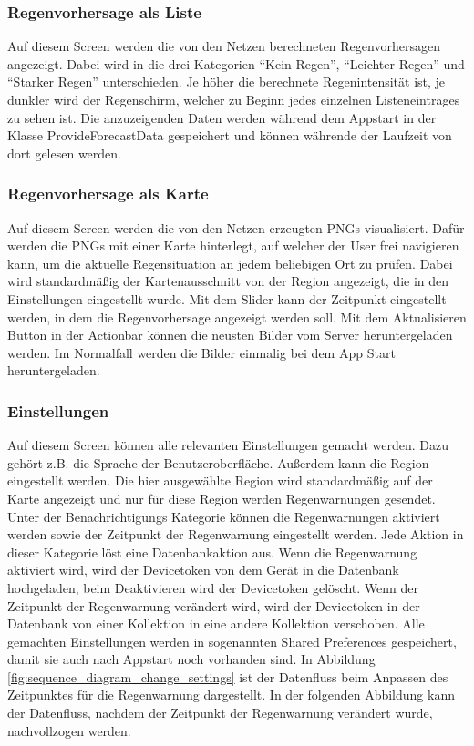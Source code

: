 \subsubsection*{Regenvorhersage als Liste}
Auf diesem Screen werden die von den Netzen berechneten Regenvorhersagen angezeigt. 
Dabei wird in die drei Kategorien “Kein Regen”, “Leichter Regen” und “Starker Regen” unterschieden. 
Je höher die berechnete Regenintensität ist, je dunkler wird der Regenschirm, welcher zu Beginn jedes einzelnen Listeneintrages zu sehen ist.   
Die anzuzeigenden Daten werden während dem Appstart in der Klasse ProvideForecastData gespeichert und können währende der Laufzeit
von dort gelesen werden.

\subsubsection*{Regenvorhersage als Karte}
Auf diesem Screen werden die von den Netzen erzeugten PNGs visualisiert. 
Dafür werden die PNGs mit einer Karte hinterlegt, auf welcher der User frei navigieren kann, 
um die aktuelle Regensituation an jedem beliebigen Ort zu prüfen. 
Dabei wird standardmäßig der Kartenausschnitt von der Region angezeigt, die in den Einstellungen eingestellt wurde. 
Mit dem Slider kann der Zeitpunkt eingestellt werden, in dem die Regenvorhersage angezeigt werden soll. 
Mit dem Aktualisieren Button in der Actionbar können die neusten Bilder vom Server heruntergeladen werden. 
Im Normalfall werden die Bilder einmalig bei dem App Start heruntergeladen.

\subsubsection*{Einstellungen}
Auf diesem Screen können alle relevanten Einstellungen gemacht werden. Dazu gehört z.B. die Sprache der Benutzeroberfläche. 
Außerdem kann die Region eingestellt werden. 
Die hier ausgewählte Region wird standardmäßig auf der Karte angezeigt und nur für diese Region werden Regenwarnungen gesendet. 
Unter der Benachrichtigungs Kategorie können die Regenwarnungen aktiviert werden sowie der Zeitpunkt der Regenwarnung eingestellt werden. 
Jede Aktion in dieser Kategorie löst eine Datenbankaktion aus. 
Wenn die Regenwarnung aktiviert wird, wird der Devicetoken von dem Gerät in die Datenbank hochgeladen, beim Deaktivieren wird der Devicetoken gelöscht. 
Wenn der Zeitpunkt der Regenwarnung verändert wird, wird der Devicetoken in der Datenbank von einer Kollektion in eine andere Kollektion verschoben.   
Alle gemachten Einstellungen werden in sogenannten Shared Preferences gespeichert, damit sie auch nach Appstart noch vorhanden sind.   
In Abbildung \ref*{fig:sequence_diagram_change_settings} ist der Datenfluss beim Anpassen des Zeitpunktes für die Regenwarnung 
dargestellt. 
In der folgenden Abbildung kann der Datenfluss, nachdem der Zeitpunkt der Regenwarnung verändert wurde, nachvollzogen werden.

